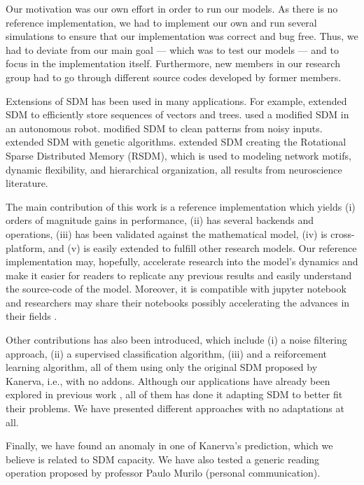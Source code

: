 Our motivation was our own effort in order to run our models. As there is no reference implementation, we had to implement our own and run several simulations to ensure that our implementation was correct and bug free. Thus, we had to deviate from our main goal --- which was to test our models --- and to focus in the implementation itself. Furthermore, new members in our research group had to go through different source codes developed by former members.

Extensions of SDM has been used in many applications. For example, \citet{Snaider2011} extended SDM to efficiently store sequences of vectors and trees.  \citet{Rajesh1998} used a modified SDM in an autonomous robot. \citet{Meng2009} modified SDM to clean patterns from noisy inputs. \citet{fan1997genetic} extended SDM with genetic algorithms. \citet{chada2016you} extended SDM creating the Rotational Sparse Distributed Memory (RSDM), which is used to modeling network motifs, dynamic flexibility, and hierarchical organization, all results from neuroscience literature.

The main contribution of this work is a reference implementation which yields (i) orders of magnitude gains in performance, (ii) has several backends and operations, (iii) has been validated against the mathematical model, (iv) is cross-platform, and (v) is easily extended to fulfill other research models. Our reference implementation may, hopefully, accelerate research into the model's dynamics and make it easier for readers to replicate any previous results and easily understand the source-code of the model.  Moreover, it is compatible with jupyter notebook and researchers may share their notebooks possibly accelerating the advances in their fields \citep{shen2014interactive}.

Other contributions has also been introduced, which include (i) a noise filtering approach, (ii) a supervised classification algorithm, (iii) and a reiforcement learning algorithm, all of them using only the original SDM proposed by Kanerva, i.e., with no addons. Although our applications have already been explored in previous work \citep{Meng2009, fan1997genetic, rao1995natural}, all of them has done it adapting SDM to better fit their problems. We have presented different approaches with no adaptations at all.

Finally, we have found an anomaly in one of Kanerva's prediction, which we believe is related to SDM capacity. We have also tested a generic reading operation proposed by professor Paulo Murilo (personal communication).

